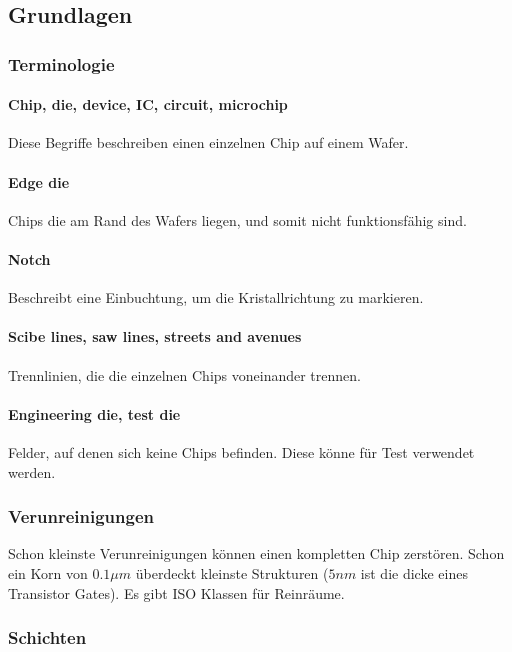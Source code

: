 
\subsection{Grundlagen}
	\subsubsection{Terminologie}
	
	\paragraph{Chip, die, device, IC, circuit, microchip} Diese Begriffe beschreiben einen einzelnen Chip auf einem Wafer.
	
	\paragraph{Edge die} Chips die am Rand des Wafers liegen, und somit nicht funktionsfähig sind. 
	
	\paragraph{Notch} Beschreibt eine Einbuchtung, um die Kristallrichtung zu markieren. 
	
	\paragraph{Scibe lines, saw lines, streets and avenues} Trennlinien, die die einzelnen Chips voneinander trennen.
	
	\paragraph{Engineering die, test die} Felder, auf denen sich keine Chips befinden. Diese könne für Test verwendet werden.
	
	\subsubsection{Verunreinigungen}
	
	Schon kleinste Verunreinigungen können einen kompletten Chip zerstören. Schon ein Korn von $0.1{\mu}m$ überdeckt kleinste Strukturen ($5nm$ ist die dicke eines Transistor Gates).
	Es gibt ISO Klassen für Reinräume.
	
	\subsubsection{Schichten}
	
